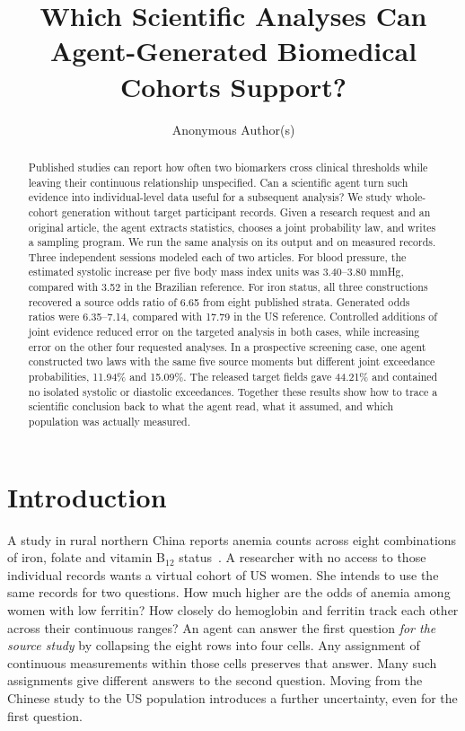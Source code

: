 \documentclass[sigconf,anonymous,review]{acmart}
\begin{document}
\title[Which Analyses Can Agent-Generated Cohorts Support?]{Which Scientific Analyses Can Agent-Gener\-ated Biomedical Cohorts Support?}
\author{Anonymous Author(s)}

\begin{abstract}
Published studies can report how often two biomarkers cross clinical thresholds while leaving their continuous relationship unspecified. Can a scientific agent turn such evidence into individual-level data useful for a subsequent analysis? We study whole-cohort generation without target participant records. Given a research request and an original article, the agent extracts statistics, chooses a joint probability law, and writes a sampling program. We run the same analysis on its output and on measured records. Three independent sessions modeled each of two articles. For blood pressure, the estimated systolic increase per five body mass index units was 3.40--3.80 mmHg, compared with 3.52 in the Brazilian reference. For iron status, all three constructions recovered a source odds ratio of 6.65 from eight published strata. Generated odds ratios were 6.35--7.14, compared with 17.79 in the US reference. Controlled additions of joint evidence reduced error on the targeted analysis in both cases, while increasing error on the other four requested analyses. In a prospective screening case, one agent constructed two laws with the same five source moments but different joint exceedance probabilities, 11.94\% and 15.09\%. The released target fields gave 44.21\% and contained no isolated systolic or diastolic exceedances. Together these results show how to trace a scientific conclusion back to what the agent read, what it assumed, and which population was actually measured.
\end{abstract}

\maketitle

\section{Introduction}
A study in rural northern China reports anemia counts across eight combinations of iron, folate and vitamin B$_{12}$ status~\cite{zhu}. A researcher with no access to those individual records wants a virtual cohort of US women. She intends to use the same records for two questions. How much higher are the odds of anemia among women with low ferritin? How closely do hemoglobin and ferritin track each other across their continuous ranges? An agent can answer the first question \emph{for the source study} by collapsing the eight rows into four cells. Any assignment of continuous measurements within those cells preserves that answer. Many such assignments give different answers to the second question. Moving from the Chinese study to the US population introduces a further uncertainty, even for the first question.
\end{document}
